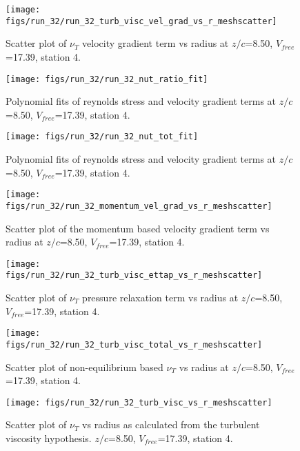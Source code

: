 \begin{figure}[H]
\centering
\texttt{[image: figs/run\_32/run\_32\_turb\_visc\_vel\_grad\_vs\_r\_meshscatter]}
\caption{Scatter plot of $\nu_T$ velocity gradient term vs radius at $z/c$=8.50, $V_{free}$=17.39, station 4.}
\end{figure}


\begin{figure}[H]
\centering
\texttt{[image: figs/run\_32/run\_32\_nut\_ratio\_fit]}
\caption{Polynomial fits of reynolds stress and velocity gradient terms at $z/c$=8.50, $V_{free}$=17.39, station 4.}
\end{figure}


\begin{figure}[H]
\centering
\texttt{[image: figs/run\_32/run\_32\_nut\_tot\_fit]}
\caption{Polynomial fits of reynolds stress and velocity gradient terms at $z/c$=8.50, $V_{free}$=17.39, station 4.}
\end{figure}


\begin{figure}[H]
\centering
\texttt{[image: figs/run\_32/run\_32\_momentum\_vel\_grad\_vs\_r\_meshscatter]}
\caption{Scatter plot of the momentum based velocity gradient term vs radius at $z/c$=8.50, $V_{free}$=17.39, station 4.}
\end{figure}


\begin{figure}[H]
\centering
\texttt{[image: figs/run\_32/run\_32\_turb\_visc\_ettap\_vs\_r\_meshscatter]}
\caption{Scatter plot of $\nu_T$ pressure relaxation term vs radius at $z/c$=8.50, $V_{free}$=17.39, station 4.}
\end{figure}


\begin{figure}[H]
\centering
\texttt{[image: figs/run\_32/run\_32\_turb\_visc\_total\_vs\_r\_meshscatter]}
\caption{Scatter plot of non-equilibrium based $\nu_T$ vs radius at $z/c$=8.50, $V_{free}$=17.39, station 4.}
\end{figure}


\begin{figure}[H]
\centering
\texttt{[image: figs/run\_32/run\_32\_turb\_visc\_vs\_r\_meshscatter]}
\caption{Scatter plot of $\nu_T$ vs radius as calculated from the turbulent viscosity hypothesis. $z/c$=8.50, $V_{free}$=17.39, station 4.}
\end{figure}


